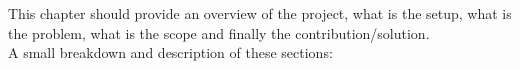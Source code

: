 This chapter should provide an overview of the project, what is the setup, what is the problem, what is the scope and finally the contribution/solution.\\
A small breakdown and description of these sections:


